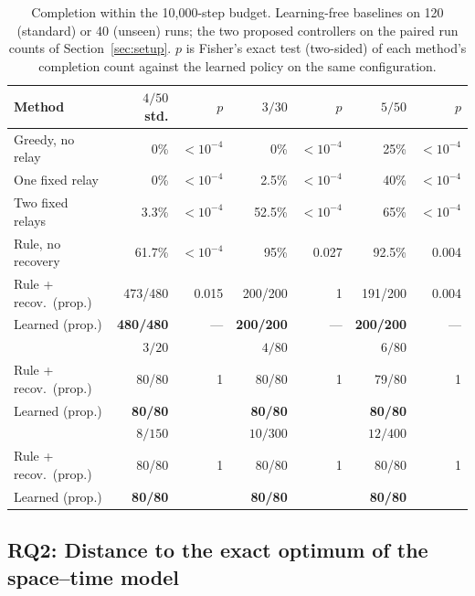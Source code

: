 \documentclass[final,5p,times,twocolumn]{elsarticle}
\begin{document}
\begin{table}[t]
\centering
\caption{Completion within the 10{,}000-step budget. Learning-free baselines on 120 (standard)
or 40 (unseen) runs; the two proposed controllers on the paired run counts of
Section~\ref{sec:setup}. $p$ is Fisher's exact test (two-sided) of each method's completion
count against the learned policy on the same configuration.}
\label{tab:completion}
\scriptsize
\setlength{\tabcolsep}{2.2pt}
\begin{tabular}{lrrrrrr}
\toprule
Method & $4/50$ std. & $p$ & $3/30$ & $p$ & $5/50$ & $p$ \\
\midrule
Greedy, no relay & 0\% & $<10^{-4}$ & 0\% & $<10^{-4}$ & 25\% & $<10^{-4}$ \\
One fixed relay & 0\% & $<10^{-4}$ & 2.5\% & $<10^{-4}$ & 40\% & $<10^{-4}$ \\
Two fixed relays & 3.3\% & $<10^{-4}$ & 52.5\% & $<10^{-4}$ & 65\% & $<10^{-4}$ \\
Rule, no recovery & 61.7\% & $<10^{-4}$ & 95\% & 0.027 & 92.5\% & 0.004 \\
Rule + recov.\ (prop.) & 473/480 & 0.015 & 200/200 & 1 & 191/200 & 0.004 \\
Learned (prop.) & \textbf{480/480} & --- & \textbf{200/200} & --- & \textbf{200/200} & --- \\
\midrule
 & $3/20$ & & $4/80$ & & $6/80$ & \\
Rule + recov.\ (prop.) & 80/80 & 1 & 80/80 & 1 & 79/80 & 1 \\
Learned (prop.) & \textbf{80/80} & & \textbf{80/80} & & \textbf{80/80} & \\
\midrule
 & $8/150$ & & $10/300$ & & $12/400$ & \\
Rule + recov.\ (prop.) & 80/80 & 1 & 80/80 & 1 & 80/80 & 1 \\
Learned (prop.) & \textbf{80/80} & & \textbf{80/80} & & \textbf{80/80} & \\
\bottomrule
\end{tabular}
\end{table}

\subsection{RQ2: Distance to the exact optimum of the space--time model}
\label{sec:rq2}
\end{document}
